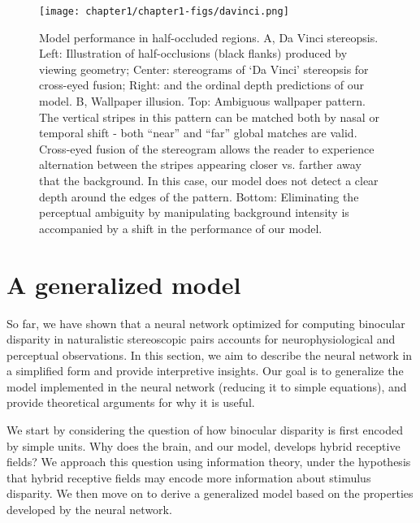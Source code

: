 \begin{figure}
  \centering
  \texttt{[image: chapter1/chapter1-figs/davinci.png]}
  \caption[Model performance in half-occluded regions.]{Model performance in half-occluded regions. A, Da Vinci stereopsis. Left: Illustration of half-occlusions (black flanks) produced by viewing geometry; Center: stereograms of ‘Da Vinci’ stereopsis for cross-eyed fusion; Right: and the ordinal depth predictions of our model. B, Wallpaper illusion. Top: Ambiguous wallpaper pattern. The vertical stripes in this pattern can be matched both by nasal or temporal shift - both “near” and “far” global matches are valid. Cross-eyed fusion of the stereogram allows the reader to experience alternation between the stripes appearing closer vs. farther away that the background. In this case, our model does not detect a clear depth around the edges of the pattern. Bottom: Eliminating the perceptual ambiguity by manipulating background intensity is accompanied by a shift in the performance of our model.}
  \label{fig:Davinci}
\end{figure}

\clearpage

\section{A generalized model}

So far, we have shown that a neural network optimized for computing binocular disparity in naturalistic stereoscopic pairs accounts for neurophysiological and perceptual observations. In this section, we aim to describe the neural network in a simplified form and provide interpretive insights. Our goal is to generalize the model implemented in the neural network (reducing it to simple equations), and provide theoretical arguments for why it is useful.

We start by considering the question of how binocular disparity is first encoded by simple units. Why does the brain, and our model, develops hybrid receptive fields? We approach this question using information theory, under the hypothesis that hybrid receptive fields may encode more information about stimulus disparity. We then move on to derive a generalized model based on the properties developed by the neural network.  

